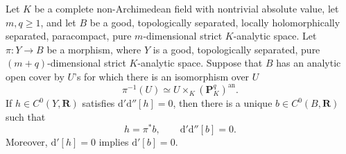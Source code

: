 \begin{proposition}
\label{prop:p062-projective-bundle-descent}
Let \(K\) be a complete non-Archimedean field with nontrivial absolute
value, let \(m,q\geq1\), and let \(B\) be a good, topologically
separated, locally holomorphically separated, paracompact, pure
\(m\)-dimensional strict \(K\)-analytic space.  Let \(\pi:Y\to B\) be a
morphism, where \(Y\) is a good, topologically separated, pure
\((m+q)\)-dimensional strict \(K\)-analytic space.  Suppose that \(B\) has
an analytic open cover by \(U\)'s for which there is an isomorphism over
\(U\)
\[
       \pi^{-1}(U)\simeq U\times_K(\mathbf P^q_K)^{\mathrm{an}}.
\]
If \(h\in C^0(Y,\mathbf R)\) satisfies
\(\mathrm d'\mathrm d''[h]=0\), then there is a unique
\(b\in C^0(B,\mathbf R)\) such that
\[
                    h=\pi^*b,
                    \qquad
                    \mathrm d'\mathrm d''[b]=0.
\]
Moreover, \(\mathrm d'[h]=0\) implies \(\mathrm d'[b]=0\).
\end{proposition}
